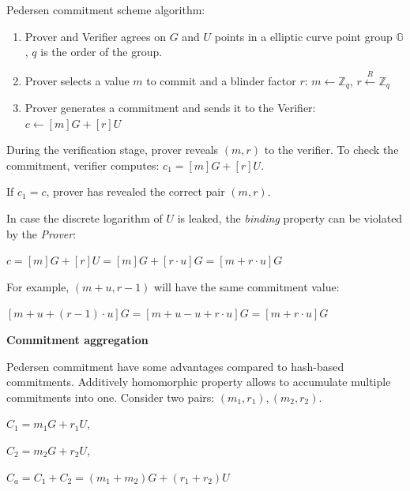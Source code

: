 \documentclass[../lecture-notes.tex]{subfiles}
\begin{document}
Pedersen commitment scheme algorithm:
\begin{enumerate}
    \item Prover and Verifier agrees on $G$ and $U$ points in a elliptic curve point group $\mathbb{G}$, $q$ is the order of the group.
    \item Prover selects a value $m$ to commit and a blinder factor $r$:
            $m \leftarrow \mathbb{Z}_q$,
            $r \xleftarrow{R} \mathbb{Z}_q$
    \item Prover generates a commitment and sends it to the Verifier:
            $c \gets [m]G + [r]U$
\end{enumerate}

During the verification stage, prover reveals $(m, r)$ to the verifier. 
To check the commitment, verifier computes: $c_1 = [m]G + [r]U$.

If $c_1 = c$, prover has revealed the correct pair $(m, r)$.

\begin{remark}
    In case the discrete logarithm of $U$ is leaked, the \textit{binding} property can be violated by the \textit{Prover}:

    \begin{center}
        $c = [m]G + [r]U = [m] G + [r \cdot u]G = [m + r \cdot u] G$
    \end{center}

    For example, $(m + u, r - 1)$ will have the same commitment value:

    \begin{center}
        $[m+u + (r-1) \cdot u] G = [m + u - u + r \cdot u] G = [m + r \cdot u] G$     
    \end{center}
    
        
\end{remark}

\vspace{0.5 cm}

\textbf{Commitment aggregation}

Pedersen commitment have some advantages compared to hash-based commitments.
Additively homomorphic property allows to accumulate multiple commitments into one.
Consider two pairs: $(m_1, r_1), (m_2, r_2)$.

\begin{center}
    $C_1 = m_1G + r_1U$,

    $C_2 = m_2G + r_2U$,

    $C_a = C_1 + C_2 = (m_1 + m_2)G + (r_1 + r_2)U$
\end{center}
\end{document}
